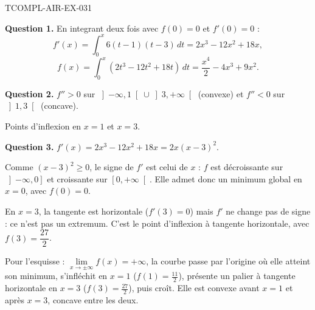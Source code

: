 \begin{corrige}{TCOMPL-AIR-EX-031}

\textbf{Question 1.} En integrant deux fois avec $f(0)=0$ et $f'(0)=0$ :
\[ f'(x) = \int_0^x 6(t-1)(t-3)\,dt = 2x^3 - 12x^2 + 18x, \]
\[ f(x) = \int_0^x (2t^3 - 12t^2 + 18t)\,dt = \frac{x^4}{2} - 4x^3 + 9x^2. \]


\textbf{Question 2.} $f'' > 0$ sur $\left]-\infty, 1\right[ \cup \left]3, +\infty\right[$ (convexe) et $f'' < 0$ sur $\left]1, 3\right[$ (concave).

Points d'inflexion en $x = 1$ et $x = 3$.

\textbf{Question 3.} $f'(x) = 2x^3 - 12x^2 + 18x = 2x(x-3)^2$.

Comme $(x-3)^2 \geq 0$, le signe de $f'$ est celui de $x$ : $f$ est décroissante
sur $\left]-\infty,0\right]$ et croissante sur $\left[0,+\infty\right[$. Elle admet
donc un minimum global en $x=0$, avec $f(0)=0$.

En $x=3$, la tangente est horizontale ($f'(3)=0$) mais $f'$ ne change pas de
signe : ce n'est pas un extremum. C'est le point d'inflexion à tangente
horizontale, avec $f(3)=\dfrac{27}{2}$.

Pour l'esquisse : $\lim\limits_{x\to\pm\infty} f(x) = +\infty$, la courbe passe par
l'origine où elle atteint son minimum, s'infléchit en $x=1$ ($f(1)=\frac{11}{2}$),
présente un palier à tangente horizontale en $x=3$ ($f(3)=\frac{27}{2}$), puis
croît. Elle est convexe avant $x=1$ et après $x=3$, concave entre les deux.

\end{corrige}

